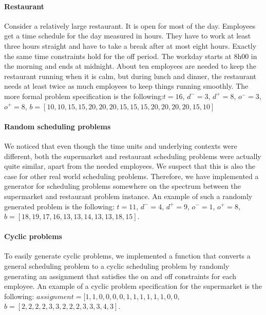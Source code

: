 \documentclass[]{article}
\begin{document}
\paragraph{Restaurant}
Consider a relatively large restaurant. It is open for most of the day. Employees get a time schedule for the day measured in hours. They have to work at least three hours straight and have to take a break after at most eight hours. Exactly the same time constraints hold for the off period. The workday starts at 8h00 in the morning and ends at midnight. About ten employees are needed to keep the restaurant running when it is calm, but during lunch and dinner, the restaurant needs at least twice as much employees to keep things running smoothly.
The more formal problem specification is the following:$t=16$, $d^- = 3$, $d^+ = 8$, $o^- = 3$, $o^+ = 8$, $b = [10,10,15,15,20,20,20,15,15,15,20,20,20,20,15,10]$

\paragraph{Random scheduling problems}
We noticed that even though the time units and underlying contexts were different, both the supermarket and restaurant scheduling problems were actually quite similar, apart from the needed employees. We suspect that this is also the case for other real world scheduling problems. Therefore, we have implemented a generator for scheduling problems somewhere on the spectrum between the supermarket and restaurant problem instance. An example of such a randomly generated problem is the following: $t=11$, $d^- = 4$, $d^+ = 9$, $o^- = 1$, $o^+ = 8$, $b = [18,19,17,16,13,13,14,13,13,18,15]$.

\paragraph{Cyclic problems}
To easily generate cyclic problems, we implemented a function that converts a general scheduling problem to a cyclic scheduling problem by randomly generating an assignment that satisfies the on and off constraints for each employee.
An example of a cyclic problem specification for the supermarket is the following:
$assignment = [1,1,0,0,0,0,1,1,1,1,1,1,0,0$, $b = [2,2,2,2,3,3,2,2,2,3,3,3,4,3]$.
\end{document}
